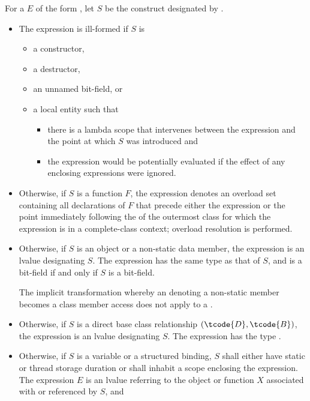 \pnum
For a  $E$ of the form ,
let $S$ be the construct designated by .
\begin{itemize}
\item
The expression is ill-formed if $S$ is
\begin{itemize}
\item
a constructor,
\item
a destructor,
\item
an unnamed bit-field, or
\item
a local entity such that
\begin{itemize}
\item
there is a lambda scope that intervenes
between the expression and the point at which $S$ was introduced and
\item
the expression would be potentially evaluated
if the effect of any enclosing  expressions
were ignored.
\end{itemize}
\end{itemize}
\item
Otherwise, if $S$ is a function $F$,
the expression denotes an overload set containing all declarations of $F$
that precede either the expression or
the point immediately following the  of
the outermost class for which the expression is in a complete-class context;
overload resolution is performed.
\item
Otherwise, if $S$ is an object or a non-static data member,
the expression is an lvalue designating $S$.
The expression has the same type as that of $S$, and
is a bit-field if and only if $S$ is a bit-field.
\begin{note}
The implicit transformation
whereby an  denoting a non-static member
becomes a class member access
does not apply to a .
\end{note}
\item
Otherwise, if $S$ is a direct base class relationship $(\tcode{D}, \tcode{B})$,
the expression is an lvalue designating $S$.
The expression has the type .
\item
Otherwise, if $S$ is a variable or a structured binding,
$S$ shall either have static or thread storage duration or
shall inhabit a scope enclosing the expression.
The expression $E$ is an lvalue referring to the object or function $X$
associated with or referenced by $S$, and

\end{itemize}
